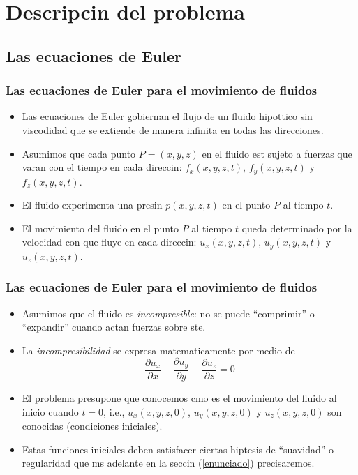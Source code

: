 \documentclass[serif,9pt]{beamer}
\begin{document}
\section{Descripcin del problema} 

\subsection{Las ecuaciones de Euler}
\begin{frame}\frametitle{Las ecuaciones de Euler para el movimiento de fluidos} 
\begin{itemize}
\item  Las ecuaciones de Euler gobiernan el flujo de un fluido hipottico sin viscodidad que se extiende
de manera infinita en todas las direcciones. \pause
\bigskip
\item Asumimos que cada punto $P=(x, y, z)$ en el fluido est sujeto a fuerzas que varan con el tiempo en cada 
direccin: $f_x(x,y,z,t)$, $f_y(x,y,z,t)$ y $f_z(x,y,z,t)$.\pause
\bigskip
\item El fluido experimenta una presin $p(x,y,z,t)$ en el punto $P$ al tiempo $t$. \pause
\bigskip
\item El movimiento del fluido en el punto $P$ al tiempo $t$ queda determinado por la velocidad con que
fluye en cada direccin: $u_x(x,y,z,t)$, $u_y(x,y,z,t)$ y $u_z(x,y,z,t)$. 
\end{itemize}

\end{frame}

\begin{frame}\frametitle{Las ecuaciones de Euler para el movimiento de fluidos} 
\begin{itemize}

\item  Asumimos que el fluido es \textit{incompresible}: no se puede ``comprimir'' o ``expandir'' cuando actan fuerzas
sobre ste.\pause
\bigskip

\item La \textit{incompresibilidad} se expresa matematicamente por medio de
\begin{equation}\label{incompresible}
 \frac{\partial u_x}{\partial x} + \frac{\partial u_y}{\partial y} + \frac{\partial u_z}{\partial z} = 0
\end{equation}\pause
\smallskip

\item El problema presupone que conocemos cmo es el movimiento del fluido al inicio cuando $t=0$, i.e.,  $u_x(x,y,z,0)$, $u_y(x,y,z,0)$ y $u_z(x,y,z,0)$ son conocidas (condiciones iniciales).\pause
\bigskip

\item Estas funciones iniciales deben satisfacer ciertas hiptesis de ``suavidad'' o regularidad que ms adelante en la seccin (\ref{enunciado}) precisaremos.
\end{itemize}

\end{frame}
\end{document}
